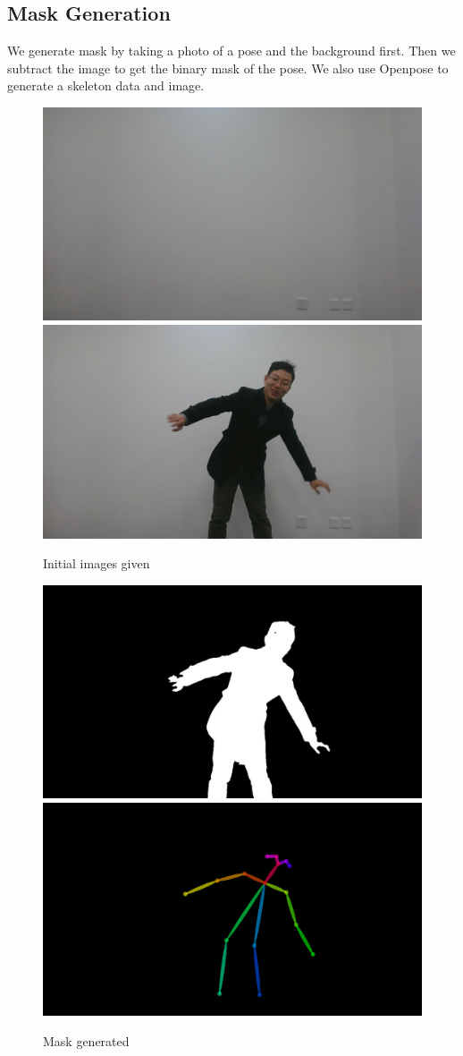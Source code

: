 \documentclass[11pt,twocolumn,letterpaper]{article}
\begin{document}
	\subsection{Mask Generation}
		\par We generate mask by taking a photo of a pose and the background first.
		Then we subtract the image to get the binary mask of the pose.
		We also use Openpose to generate a skeleton data and image.
		\begin{figure}[h]
			\centering
			\includegraphics[width=0.45\linewidth]{./Pic/Approach_Mask_back}
			\includegraphics[width=0.45\linewidth]{./Pic/Approach_Mask_pose}
			\caption{Initial images given}
		\end{figure}
		\begin{figure}[h]
			\centering
			\includegraphics[width=0.9\linewidth]{./Pic/Approach_Mask_binary_mask}
			\includegraphics[width=0.9\linewidth]{./Pic/Approach_Mask_skeleton}
			\caption{Mask generated}
		\end{figure}
\end{document}
